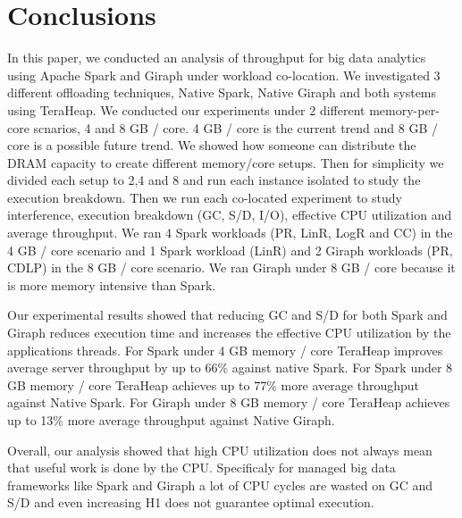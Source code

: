\section{Conclusions}

In this paper, we conducted an analysis of throughput for big data analytics
using Apache Spark and Giraph under workload co-location. We investigated 3 different offloading techniques, Native Spark, Native Giraph and both systems using TeraHeap. We conducted our experiments under 2 different memory-per-core
scnarios, 4 and 8 GB / core. 4 GB / core is the current trend and 8 GB / core is a possible future trend. 
We showed how someone can distribute the DRAM capacity to create different memory/core setups.
Then for simplicity we divided each setup to 2,4 and 8 and run each instance isolated to study the execution breakdown.
Then we run each co-located experiment to study interference, execution breakdown (GC, S/D, I/O), effective CPU utilization and average throughput. We ran 4 Spark workloads (PR, LinR, LogR and CC) in the 4 GB / core scenario and 1 Spark workload (LinR) and 2 Giraph workloads (PR, CDLP) in the 8 GB / core scenario. We ran Giraph under 8 GB / core because it is more memory intensive than Spark.

Our experimental results showed that reducing GC and S/D for both Spark and Giraph reduces execution time and increases the effective CPU utilization by the applications threads. 
For Spark under 4 GB memory / core TeraHeap improves average server throughput by up to 66\% against native Spark.
For Spark under 8 GB memory / core TeraHeap achieves up to 77\% more average throughput against Native Spark.
For Giraph under 8 GB memory / core TeraHeap achieves up to 13\% more average throughput against Native Giraph. 

Overall, our analysis showed that high CPU utilization does not always mean that useful work is done by the CPU. Specificaly for managed
big data frameworks like Spark and Giraph a lot of CPU cycles are wasted on GC and S/D and even increasing H1 does not guarantee optimal execution.
